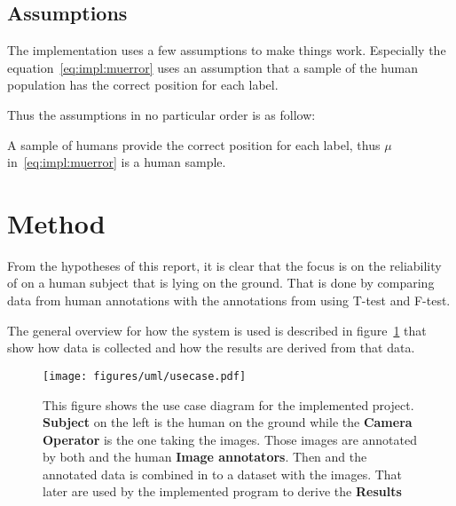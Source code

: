 
\subsection{Assumptions}%
\label{sub:assumptions}
The implementation uses a few assumptions to make things work.
Especially the equation~\ref{eq:impl:muerror} uses an assumption that a sample of the human population has the correct position for each label.

\noindent
Thus the assumptions in no particular order is as follow:
\begin{itemize}
    \itemize A sample of humans provide the correct position for each label, thus $\mu$ in~\ref{eq:impl:muerror} is a human sample.
\end{itemize}


\section{Method}
\label{sec:method}
From the hypotheses of this report, it is clear that the focus is on the reliability of \openpose{ } on a human subject that is lying on the ground.
That is done by comparing data from human annotations with the annotations from \operpose{} using T-test and F-test.

The general overview for how the system is used is described in figure~\ref{fig:usecase} that show how data is collected and how the results are derived from that data.

\begin{figure}
\begin{center}
    \texttt{[image: figures/uml/usecase.pdf]}
\end{center}
\caption{This figure shows the use case diagram for the implemented project. \textbf{Subject} on the left is the human on the ground while the \textbf{Camera Operator} is the one taking the images.
Those images are annotated by both \openpose{ } and the human \textbf{Image annotators}.
Then \openpose{ } and the annotated data is combined in to a dataset with the images.
That later are used by the implemented program to derive the \textbf{Results}}
\label{fig:usecase}
\end{figure}

